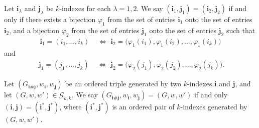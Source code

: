 \begin{definition}
  \notready
  \label{def:index_pair_rel}
  \uses{} %
  Let $\mathbf{i}_\lambda$ and $\mathbf{j}_\lambda$ be $k$-indexes for each $\lambda=1,2$.
  We say $(\mathbf{i}_1,\mathbf{j}_1) = (\mathbf{i}_2,\mathbf{j}_2)$ if and only if there exists a
  bijection $\varphi_1$ from the set of entries $\mathbf{i}_1$ onto the set of entries $\mathbf{i}_2$,
  and a bijection $\varphi_2$ from the set of entries $\mathbf{j}_1$ onto the set of entries $\mathbf{j}_2$ such that
  \begin{equation}
  \begin{split}
    \mathbf{i}_1 = (i_1,...,i_k) & \,\, \Longleftrightarrow \,\, \mathbf{i}_2 = \bigl( \varphi_1(i_1),\varphi_1(i_2),...,\varphi_1(i_k) \bigl)
  \end{split}
  \end{equation}
  and
  \begin{equation}
  \begin{split}
    \phantom{.}\mathbf{j}_1 = (j_1,...,j_k) & \,\, \Longleftrightarrow \,\, \mathbf{j}_2 = \bigl( \varphi_2(j_1),\varphi_2(j_2),...,\varphi_2(j_k) \bigl).
  \end{split}
  \end{equation}
\end{definition}


\begin{definition}
  \notready
  \label{def:graph_walk_triple_rel}
  Let $(G_{\mathbf{i} \# \mathbf{j}},w_\mathbf{i},w_\mathbf{j})$ be an ordered triple generated by
  two $k$-indexes $\mathbf{i}$ and $\mathbf{j}$, and let $(G,w,w') \in \mathcal{G}_{k,k}$.
  We say $(G_{\mathbf{i} \# \mathbf{j}},w_\mathbf{i},w_\mathbf{j}) = (G,w,w')$ if and only
  $(\mathbf{i},\mathbf{j}) = (\mathbf{i}^*,\mathbf{j}^*)$,
  where $(\mathbf{i}^*,\mathbf{j}^*)$ is an ordered pair of $k$-indexes generated by $(G,w,w')$.
\end{definition}


